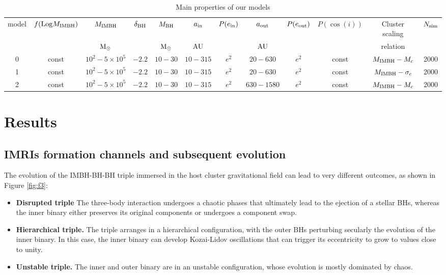\documentclass[twocolumn]{aastex62}
\newcommand{\Log}{{\rm Log}}
\newcommand{\Ms}{{\rm M}_\odot}
\newcommand{\au}{{\rm AU}}
\newcommand{\ibh}{{\rm IMBH}}
\newcommand{\inn}{{\rm in}}
\newcommand{\out}{{\rm out}}
\newcommand{\bh}{{\rm BH}}
\begin{document}
\begin{table}
\begin{center}
\caption{Main properties of our models}
\begin{tabular}{cccccccccccc}
\hline
model   & $f(\Log M_\ibh)$ & $M_\ibh$ & $\delta_\bh$ & $M_\bh$ & $a_\inn$ & $P(e_\inn)$ & $a_\out$ & $P(e_\out)$ &$P(\cos(i))$ &Cluster scaling & $N_{\rm sim}$\\ 
        &             & $\Ms$    &            & $\Ms$   & $\au$    &          & $\au$    &         &  &relation &\\
\hline 
0 & const & $10^2-5\times 10^5$ & $-2.2$ & $10-30$ & $10-315$ & $e^2$ & $20-630$ & $e^2$ & const&$M_\ibh -M_c$ & 2000\\
1 & const & $10^2-5\times 10^5$ & $-2.2$ & $10-30$ & $10-315$ & $e^2$ & $20-630$ & $e^2$ & const&$M_\ibh -\sigma_c$ & 2000\\
2 & const & $10^2-5\times 10^5$ & $-2.2$ & $10-30$ & $10-315$ & $e^2$ & $630-1580$ & $e^2$ &const &$M_\ibh -M_c$ & 2000\\
\hline
\end{tabular}
\end{center}
\label{tab:t2}
\end{table}



\section{Results}
\label{res}


\subsection{IMRIs formation channels and subsequent evolution}

The evolution of the IMBH-BH-BH triple immersed in the host cluster gravitational field can lead to very different outcomes, as shown in Figure \ref{fig:f3}:
\begin{itemize}
    \item {\bf Disrupted triple} The three-body interaction undergoes a chaotic phases that ultimately lead to the ejection of a stellar BHs, whereas the inner binary either preserves its original components or undergoes a component swap.
    \item {\bf Hierarchical triple.} The triple arranges in a hierarchical configuration, with the outer BHs perturbing secularly the evolution of the inner binary. In this case, the inner binary can develop Kozai-Lidov oscillations \citep{kozai62,lidov62} that can trigger its eccentricity to grow to values close to unity. 
    \item {\bf Unstable triple.} The inner and outer binary are in an unstable configuration, whose evolution is mostly dominated by chaos.
\end{itemize}
\end{document}
